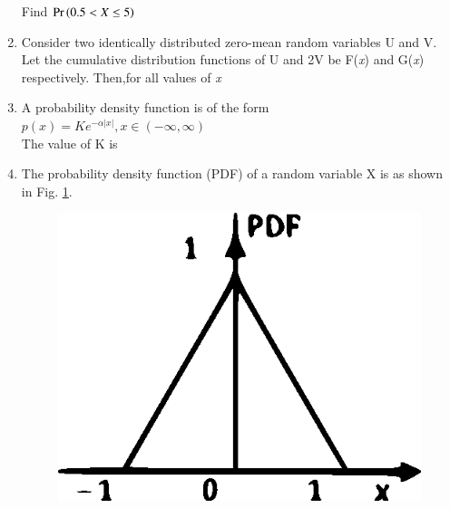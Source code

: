 \begin{enumerate}[label=\thesection.\arabic*.,ref=\thesection.\theenumi]
Find $\Pr\left(0.5< X \leq 5\right)$
\\
\solution

%
\item Consider two identically distributed zero-mean random variables U and V. Let the cumulative distribution functions of U and 2V be F(\textit{x}) and G(\textit{x}) respectively. Then,for all values of \textit{x}
\begin{enumerate}
\end{enumerate}
%
\solution

%
\item A probability density function is of the form\\
{\centering $p(\textit{x}) = Ke^{-\alpha |x|}, \textit{x}\in(-\infty,\infty)$\\}
The value of K is 

\begin{enumerate}
\end{enumerate}


\item The probability density function (PDF) of a random variable X is as shown in Fig. \ref{fig:2}.
\begin{figure}[!h]
\includegraphics[width=\columnwidth]{./figs/figure2.eps}
\caption{}
\label{fig:2}
\end{figure}


\end{enumerate}
